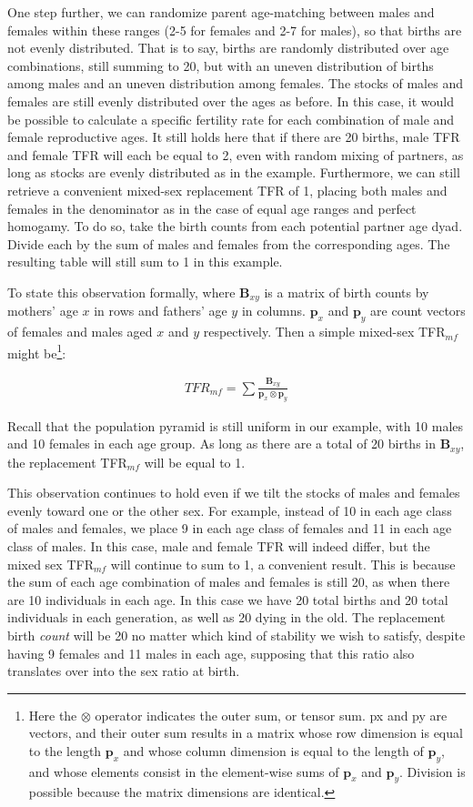 \documentclass[reqno,12pt,oneside,a4paper]{report} %
\theoremstyle{plain}
\theoremstyle{definition}
\theoremstyle{remark}
\numberwithin{theorem}{chapter}     %
\begin{document}
One step further, we can randomize parent age-matching between males and females within these ranges (2-5 for females and 2-7 for males), so that births are not evenly distributed. That is to say, births are randomly distributed over age combinations, still summing to 20, but with an uneven distribution of births among males and an uneven distribution among females. The stocks of males and females are still evenly distributed over the ages as before. In this case, it would be possible to calculate a specific fertility rate for each combination of male and female reproductive ages. It still holds here that if there are 20 births, male TFR and female TFR will each be equal to 2, even with random mixing of partners, as long as stocks are evenly distributed as in the example. Furthermore, we can still retrieve a convenient mixed-sex replacement TFR of 1, placing both males and females in the denominator as in the case of equal age ranges and perfect homogamy. To do so, take the birth counts from each potential partner age dyad. Divide each by the sum of males and females from the corresponding ages. The resulting table will still sum to 1 in this example.

To state this observation formally, where $\textbf{B}_{xy}$ is a matrix of birth counts by mothers' age $x$ in rows and fathers' age $y$ in columns. $\textbf{p}_x$ and $\textbf{p}_y$ are count vectors of females and males aged $x$ and $y$ respectively. Then a simple mixed-sex TFR$_{mf}$ might be\footnote{Here the $\otimes$ operator indicates the outer sum, or tensor sum. px and py are vectors, and their outer sum results in a matrix whose row dimension is equal to the length $\textbf{p}_x$ and whose column dimension is equal to the length of $\textbf{p}_y$, and whose elements consist in the element-wise sums of $\textbf{p}_x$ and $\textbf{p}_y$. Division is possible because the matrix dimensions are identical.}:

\begin{align}
TFR_{mf} = \sum\frac{\textbf{B}_{xy}}{\textbf{p}_x \otimes \textbf{p}_y}
\end{align}

Recall that the population pyramid is still uniform in our example, with 10 males and 10 females in each age group. As long as there are a total of 20 births in $\textbf{B}_{xy}$, the replacement TFR$_{mf}$ will be equal to 1.

This observation continues to hold even if we tilt the stocks of males and females evenly toward one or the other sex. For example, instead of 10 in each age class of males and females, we place 9 in each age class of females and 11 in each age class of males. In this case, male and female TFR will indeed differ, but the mixed sex TFR$_{mf}$ will continue to sum to 1, a convenient result. This is because the sum of each age combination of males and females is still 20, as when there are 10 individuals in each age. In this case we have 20 total births and 20 total individuals in each generation, as well as 20 dying in the old. The replacement birth \textit{count} will be 20 no matter which kind of stability we wish to satisfy, despite having 9 females and 11 males in each age, supposing that this ratio also translates over into the sex ratio at birth.
\end{document}
